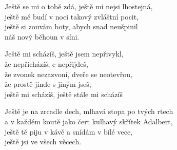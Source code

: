 
\ve{}
Ještě se mi o tobě zdá, ještě mi nejsi lhostejná,\\
ještě mě budí v noci takový zvláštní pocit,\\
ještě si zouvám boty, abych snad neušpinil\\
náš nový běhoun v síni.

\cho{}
Ještě mi scházíš, ještě jsem nepřivykl,\\
že nepřicházíš, e nepřijdeš,\\
že zvonek nezazvoní, dveře se neotevřou,\\
že prostě jinde s jiným jseš,\\
ještě mi scházíš, ještě stále mi scházíš  \quad {} \quad {} \quad {} \quad {}

\ve{}
Ještě je na zrcadle dech, mlhavá stopa po tvých rtech\\
a v každém koutě jako čert kulhavý skřítek Adalbert,\\
ještě tě piju v kávě a snídám v bílé vece,\\
ještě jsi ve všech věcech. 

\cho{}

\esong{}